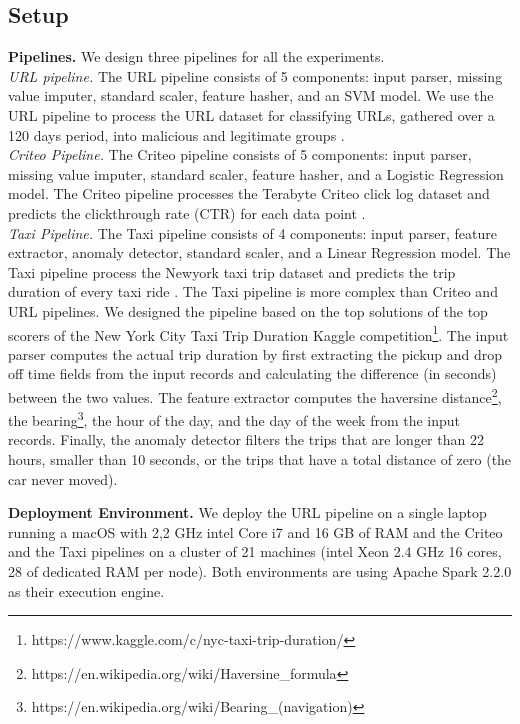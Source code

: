 \subsection{Setup}\label{subsec:setup}
\textbf{Pipelines.}
We design three pipelines for all the experiments.\\
\textit{URL pipeline. } The URL pipeline consists of 5 components: input parser, missing value imputer, standard scaler, feature hasher, and an SVM model.
We use the URL pipeline to process the URL dataset for classifying URLs, gathered over a 120 days period, into malicious and legitimate groups \cite{ma2009identifying}.\\
\textit{Criteo Pipeline.} 
The Criteo pipeline consists of 5 components: input parser, missing value imputer, standard scaler, feature hasher, and a Logistic Regression model.
The Criteo pipeline processes the Terabyte Criteo click log dataset and predicts the clickthrough rate (CTR) for each data point \cite{criteo-log}.\\
\textit{Taxi Pipeline.}
The Taxi pipeline consists of 4 components: input parser, feature extractor, anomaly detector, standard scaler, and a Linear Regression model.
The Taxi pipeline process the Newyork taxi trip dataset and predicts the trip duration of every taxi ride \cite{newyork-taxi}. The Taxi pipeline is more complex than Criteo and URL pipelines. We designed the pipeline based on the top solutions of the top scorers of the New York City Taxi Trip Duration Kaggle competition\footnote{https://www.kaggle.com/c/nyc-taxi-trip-duration/}. The input parser computes the actual trip duration by first extracting the pickup and drop off time fields from the input records and calculating the difference (in seconds) between the two values.
The feature extractor computes the haversine distance\footnote{https://en.wikipedia.org/wiki/Haversine\_formula}, the bearing\footnote{https://en.wikipedia.org/wiki/Bearing\_(navigation)}, the hour of the day, and the day of the week from the input records. Finally, the anomaly detector filters the trips that are longer than 22 hours, smaller than 10 seconds, or the trips that have a total distance of zero (the car never moved). 

\textbf{Deployment Environment. }
We deploy the URL pipeline on a single laptop running a macOS with 2,2 GHz intel Core i7 and 16 GB of RAM and the Criteo and the Taxi pipelines on a cluster of 21 machines (intel Xeon 2.4 GHz 16 cores, 28 of dedicated RAM per node).
Both environments are using Apache Spark 2.2.0 as their execution engine.

